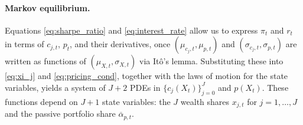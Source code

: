 \paragraph{Markov equilibrium.} 

Equations \eqref{eq:sharpe_ratio} and \eqref{eq:interest_rate} allow us to express $\pi_t$ and $r_t$ in terms of $c_{j,t}$, $p_t$, and their derivatives, once $(\mu_{c_j,t}, \mu_{p,t})$ and $(\sigma_{c_j,t}, \sigma_{p,t})$ are written as functions of $(\mu_{X,t}, \sigma_{X,t})$ via Itô’s lemma. Substituting these into \eqref{eq:xi_j} and \eqref{eq:pricing_cond}, together with the laws of motion for the state variables, yields a system of $J+2$ PDEs in $\{c_j(X_t)\}_{j=0}^J$ and $p(X_t)$. These functions depend on $J+1$ state variables: the $J$ wealth shares $x_{j,t}$ for $j=1,\ldots,J$ and the passive portfolio share $\overline{\alpha}_{p,t}$.  





